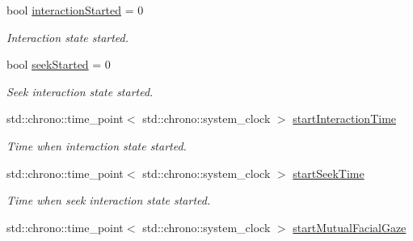 \begin{DoxyCompactItemize}
\item 
bool \hyperlink{classSocialPlanner_a13bcec9af0fe2827d8cb1054ea20b591}{interaction\+Started} = 0\hypertarget{classSocialPlanner_a13bcec9af0fe2827d8cb1054ea20b591}{}\label{classSocialPlanner_a13bcec9af0fe2827d8cb1054ea20b591}

\begin{DoxyCompactList}\small\item\em Interaction state started. \end{DoxyCompactList}\item 
bool \hyperlink{classSocialPlanner_abb314ece6c333d6afc821f9a040b38ae}{seek\+Started} = 0\hypertarget{classSocialPlanner_abb314ece6c333d6afc821f9a040b38ae}{}\label{classSocialPlanner_abb314ece6c333d6afc821f9a040b38ae}

\begin{DoxyCompactList}\small\item\em Seek interaction state started. \end{DoxyCompactList}\item 
std\+::chrono\+::time\+\_\+point$<$ std\+::chrono\+::system\+\_\+clock $>$ \hyperlink{classSocialPlanner_ab22aaaf906f821e511c7703a4b663442}{start\+Interaction\+Time}\hypertarget{classSocialPlanner_ab22aaaf906f821e511c7703a4b663442}{}\label{classSocialPlanner_ab22aaaf906f821e511c7703a4b663442}

\begin{DoxyCompactList}\small\item\em Time when interaction state started. \end{DoxyCompactList}\item 
std\+::chrono\+::time\+\_\+point$<$ std\+::chrono\+::system\+\_\+clock $>$ \hyperlink{classSocialPlanner_a80652fac5bcf138d82f9b80674a9e922}{start\+Seek\+Time}\hypertarget{classSocialPlanner_a80652fac5bcf138d82f9b80674a9e922}{}\label{classSocialPlanner_a80652fac5bcf138d82f9b80674a9e922}

\begin{DoxyCompactList}\small\item\em Time when seek interaction state started. \end{DoxyCompactList}\item 
std\+::chrono\+::time\+\_\+point$<$ std\+::chrono\+::system\+\_\+clock $>$ \hyperlink{classSocialPlanner_ae727d2e77b91cb5bf494249611dd86d0}{start\+Mutual\+Facial\+Gaze}\hypertarget{classSocialPlanner_ae727d2e77b91cb5bf494249611dd86d0}{}\label{classSocialPlanner_ae727d2e77b91cb5bf494249611dd86d0}


\end{DoxyCompactItemize}
